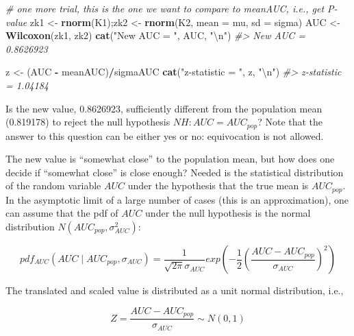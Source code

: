 \documentclass[
]{book}
\newenvironment{Shaded}{\begin{snugshade}}{\end{snugshade}}
\newcommand{\CharTok}[1]{\textcolor[rgb]{0.31,0.60,0.02}{#1}}
\newcommand{\CommentTok}[1]{\textcolor[rgb]{0.56,0.35,0.01}{\textit{#1}}}
\newcommand{\DataTypeTok}[1]{\textcolor[rgb]{0.13,0.29,0.53}{#1}}
\newcommand{\KeywordTok}[1]{\textcolor[rgb]{0.13,0.29,0.53}{\textbf{#1}}}
\newcommand{\NormalTok}[1]{#1}
\newcommand{\OperatorTok}[1]{\textcolor[rgb]{0.81,0.36,0.00}{\textbf{#1}}}
\newcommand{\StringTok}[1]{\textcolor[rgb]{0.31,0.60,0.02}{#1}}
\begin{document}
\begin{Shaded}
\begin{Highlighting}[]
\CommentTok{\# one more trial, this is the one we want to compare to meanAUC, i.e., get P{-}value}
\NormalTok{zk1 \textless{}{-}}\StringTok{ }\KeywordTok{rnorm}\NormalTok{(K1);zk2 \textless{}{-}}\StringTok{ }\KeywordTok{rnorm}\NormalTok{(K2, }\DataTypeTok{mean =}\NormalTok{ mu, }\DataTypeTok{sd =}\NormalTok{ sigma) }
\NormalTok{AUC \textless{}{-}}\StringTok{ }\KeywordTok{Wilcoxon}\NormalTok{(zk1, zk2)}
\KeywordTok{cat}\NormalTok{(}\StringTok{"New AUC = "}\NormalTok{, AUC, }\StringTok{"}\CharTok{\textbackslash{}n}\StringTok{"}\NormalTok{)}
\CommentTok{\#\textgreater{} New AUC =  0.8626923}

\NormalTok{z \textless{}{-}}\StringTok{ }\NormalTok{(AUC }\OperatorTok{{-}}\StringTok{ }\NormalTok{meanAUC)}\OperatorTok{/}\NormalTok{sigmaAUC}
\KeywordTok{cat}\NormalTok{(}\StringTok{"z{-}statistic = "}\NormalTok{, z, }\StringTok{"}\CharTok{\textbackslash{}n}\StringTok{"}\NormalTok{)}
\CommentTok{\#\textgreater{} z{-}statistic =  1.04184}
\end{Highlighting}
\end{Shaded}

Is the new value, 0.8626923, sufficiently different from the population mean (0.819178) to reject the null hypothesis \(NH: AUC = AUC_{pop}\)? Note that the answer to this question can be either yes or no: equivocation is not allowed.

The new value is ``somewhat close'' to the population mean, but how does one decide if ``somewhat close'' is close enough? Needed is the statistical distribution of the random variable \(AUC\) under the hypothesis that the true mean is \(AUC_{pop}\). In the asymptotic limit of a large number of cases (this is an approximation), one can assume that the pdf of \(AUC\) under the null hypothesis is the normal distribution \(N\left ( AUC_{pop}, \sigma_{AUC}^{2} \right )\):

\begin{equation*} 
pdf_{AUC}\left ( AUC\mid AUC_{pop}, \sigma_{AUC} \right )=\frac{1}{\sqrt{2\pi}\sigma_{AUC}}exp\left ( -\frac{1}{2} \left ( \frac{AUC-AUC_{pop}}{\sigma_{AUC}} \right )^2\right )
\end{equation*}

The translated and scaled value is distributed as a unit normal distribution, i.e.,

\begin{equation*} 
Z=\frac{AUC-AUC_{pop}}{\sigma_{AUC}}\sim N\left ( 0,1 \right )
\end{equation*}
\end{document}
